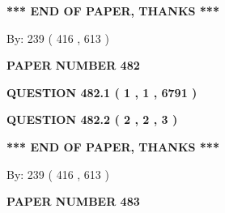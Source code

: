 \documentclass[12pt]{article}
\begin{document}
   
   
   
   
\vspace{1.0in} 
{\textbf{\large{ *** END OF PAPER, THANKS *** }}} 
   
   
\hspace{1.0in} By: 
 239 ( 416 ,  613 )
   
   
   
   
\newpage 
\setcounter{page}{ 
   482001 } 
   
   
   
   
 {\textbf{ \Large{ PAPER NUMBER  482  }}}
   
   
\vspace{0.2in}
   
   
   
   
   
   
 \vspace{0.2in}
 
 
 
 
   
   
  
\vspace{0.2in}
  
{\textbf{\Large{QUESTION
482.1 
 ( 1 , 1 , 6791 )
}}}
  
  
  
\vspace{0.2in}
  
{\textbf{\Large{QUESTION
482.2 
 ( 2 , 2 , 3 )
}}}
  
  
   
   
 \vspace{0.2in}
 
   
   
   
   
\vspace{1.0in} 
{\textbf{\large{ *** END OF PAPER, THANKS *** }}} 
   
   
\hspace{1.0in} By: 
 239 ( 416 ,  613 )
   
   
   
   
\newpage 
\setcounter{page}{ 
   483001 } 
   
   
   
   
 {\textbf{ \Large{ PAPER NUMBER  483  }}}
   
   
\vspace{0.2in}
   
\end{document}
